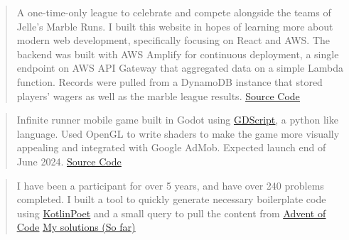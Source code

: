 

\begin{cvparagraph}

\begin{quote}
\thinspace A one-time-only league to celebrate and compete alongside the teams of Jelle's Marble Runs. I built this website in hopes of learning 
more about modern web development, specifically focusing on React and AWS. The backend was built with AWS Amplify for continuous deployment, a single endpoint on AWS API Gateway
that aggregated data on a simple Lambda function. Records were pulled from a DynamoDB instance that stored players' wagers as well as the marble league results.
\newline\href{https://github.com/johnsoe/thg_marbles}{\underline {Source Code}}
\end{quote}

\begin{quote}
\thinspace Infinite runner mobile game built in Godot using \href{https://docs.godotengine.org/en/stable/tutorials/scripting/gdscript/gdscript_basics.html}{\underline{GDScript}}, a python like language.
Used OpenGL to write shaders to make the game more visually appealing and integrated with Google AdMob. Expected launch end of June 2024. 
\newline\href{https://github.com/johnsoe/Track-Four}{\underline {Source Code}}
\end{quote}

\begin{quote}
\thinspace I have been a participant for over 5 years, and have over 240 problems completed.
I built a tool to quickly generate necessary boilerplate code using \href{https://square.github.io/kotlinpoet/}{\underline{KotlinPoet}} and a small query to pull the content from \href{https://adventofcode.com}{\underline{Advent of Code}}
\newline\href{https://github.com/johnsoe/advent_kotlin}{\underline {My solutions (So far)}}
\end{quote}


\end{cvparagraph}
